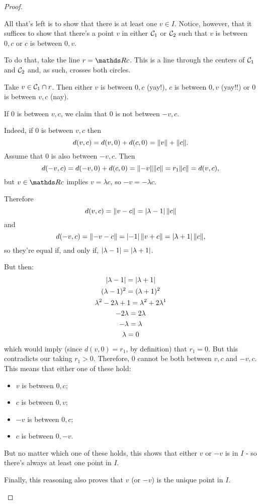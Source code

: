 \begin{proof}
\begin{itemize}
		All that's left is to show that there is at least one $v\in I$. Notice, however, that it suffices to show that there's a point $v$ in either $\mathcal C_1$ or $\mathcal C_2$ such that $v$ is between $0,c$ or $c$ is between $0,v$.
		
		To do that, take the line $r=\R c$. This is a line through the centers of $\mathcal C_1$ and $\mathcal C_2$ and, as such, crosses both circles.
		
		Take $v\in \mathcal C_1\cap r$. Then either $v$ is between $0,c$ (yay!), $c$ is between $0,v$ (yay!!) or $0$ is between $v,c$ (nay).
		
		If $0$ is between $v,c$, we claim that $0$ is not between $-v,c$.
		
		Indeed, if $0$ is between $v,c$ then
		\[d(v,c)=d(v,0)+d(c,0)=\lVert v\rVert+\lVert c\rVert.\]Assume that $0$ is also between $-v,c$. Then
		\[d(-v,c)=d(-v,0)+d(c,0)=\lVert-v\rVert\lVert c\rVert=r_1\lVert c\rVert=d(v,c),\]but $v\in \R c$ implies $v=\lambda c$, so $-v=-\lambda c$.
		
		Therefore
		\[d(v,c)=\lVert v-c\rVert=\left\vert\lambda-1\right\vert\lVert c\rVert\]and
		\[d(-v,c)=\lVert-v-c\rVert=\left\vert-1\right\vert\lVert v+c\rVert=\left\vert\lambda+1\right\vert\lVert c\rVert,\]so they're equal if, and only if, $\left\vert\lambda-1\right\vert=\left\vert\lambda+1\right\vert$.
		
		But then:
		\begin{gather*}
			\left\vert\lambda-1\right\vert=\left\vert\lambda+1\right\vert\\
			(\lambda-1)^2=(\lambda+1)^2\\
			\lambda^2-2\lambda+1=\lambda^2+2\lambda^1\\
			-2\lambda=2\lambda\\
			-\lambda=\lambda\\
			\lambda=0
		\end{gather*}which would imply (since $d(v,0)=r_1$, by definition) that $r_1=0$. But this contradicts our taking $r_1>0$. Therefore, $0$ cannot be both between $v,c$ and $-v,c$. This means that either one of these hold:
		\begin{itemize}
			\item $v$ is between $0,c$;
			\item $c$ is between $0,v$;
			\item $-v$ is between $0,c$;
			\item $c$ is between $0,-v$.
		\end{itemize}
	
	But no matter which one of these holds, this shows that either $v$ or $-v$ is in $I$ - so there's always at least one point in $I$.
	
	Finally, this reasoning also proves that $v$ (or $-v$) is the unique point in $I$.
	

\end{itemize}
\end{proof}
